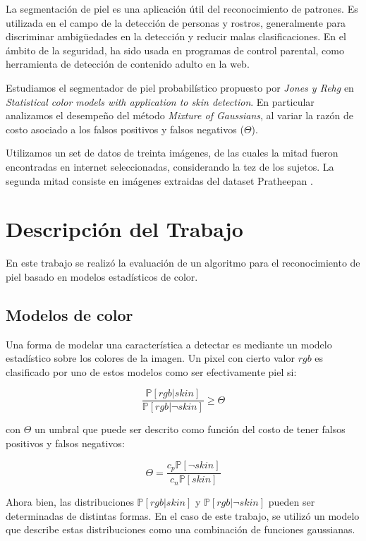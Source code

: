\documentclass[12pt]{article}
\begin{document}
La segmentación de piel es una aplicación útil del reconocimiento de patrones.
Es utilizada en el campo de la detección de personas y rostros, generalmente
para discriminar ambigüedades en la detección y reducir malas clasificaciones.
En el ámbito de la seguridad, ha sido usada en programas de control parental,
como herramienta de detección de contenido adulto en la web.

Estudiamos el segmentador de piel probabilístico propuesto por \emph{Jones y
Rehg} en \emph{Statistical color models with application to skin
detection}\cite{skin}. En particular analizamos el desempeño del método
\emph{Mixture of Gaussians}, al variar la razón de costo asociado a los falsos
positivos y falsos negativos ($\Theta$).

Utilizamos un set de datos de treinta imágenes, de las cuales la mitad fueron
encontradas en internet seleccionadas, considerando la tez de los sujetos. La
segunda mitad consiste en imágenes extraidas del dataset Pratheepan
\cite{dataset}.

\section{Descripción del Trabajo}

En este trabajo se realizó la evaluación de un algoritmo para el reconocimiento
de piel basado en modelos estadísticos de color. 

\subsection{Modelos de color}

Una forma de modelar una característica a detectar es mediante un modelo
estadístico sobre los colores de la imagen. Un pixel con cierto valor $rgb$ es
clasificado por uno de estos modelos como ser efectivamente piel si:

\begin{equation}
    \frac{ \mathbb{P} [ rgb|skin ] }{ \mathbb{P} [ rgb | \neg skin ] } \geq
    \Theta
\end{equation}

con $\Theta$ un umbral que puede ser descrito como función del costo de tener
falsos positivos y falsos negativos:

\begin{equation}
    \Theta = \frac{c_p \mathbb{P} [\neg skin]}{c_n \mathbb{P}[skin]}
\end{equation}

Ahora bien, las distribuciones $\mathbb{P} [ rgb|skin ]$ y $\mathbb{P} [ rgb | \neg
skin ]$ pueden ser determinadas de distintas formas. En el caso de este trabajo, se
utilizó un modelo que describe estas distribuciones como una combinación de
funciones gaussianas.
\end{document}
